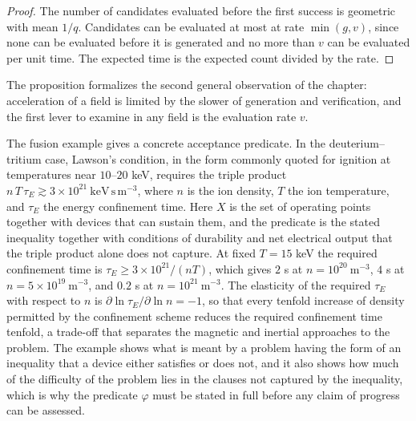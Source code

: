 \begin{proof}
The number of candidates evaluated before the first success is geometric with mean $1/q$. Candidates can be evaluated at most at rate $\min(g,v)$, since none can be evaluated before it is generated and no more than $v$ can be evaluated per unit time. The expected time is the expected count divided by the rate.
\end{proof}

The proposition formalizes the second general observation of the chapter: acceleration of a field is limited by the slower of generation and verification, and the first lever to examine in any field is the evaluation rate $v$.

The fusion example gives a concrete acceptance predicate. In the deuterium--tritium case, Lawson's condition, in the form commonly quoted for ignition at temperatures near $10$--$20$ keV, requires the triple product $n\,T\,\tau_E\gtrsim3\times10^{21}\ \mathrm{keV\,s\,m^{-3}}$, where $n$ is the ion density, $T$ the ion temperature, and $\tau_E$ the energy confinement time. Here $X$ is the set of operating points together with devices that can sustain them, and the predicate is the stated inequality together with conditions of durability and net electrical output that the triple product alone does not capture. At fixed $T=15$ keV the required confinement time is $\tau_E\ge 3\times10^{21}/(nT)$, which gives $2$ s at $n=10^{20}\ \mathrm{m^{-3}}$, $4$ s at $n=5\times10^{19}\ \mathrm{m^{-3}}$, and $0.2$ s at $n=10^{21}\ \mathrm{m^{-3}}$. The elasticity of the required $\tau_E$ with respect to $n$ is $\partial\ln\tau_E/\partial\ln n=-1$, so that every tenfold increase of density permitted by the confinement scheme reduces the required confinement time tenfold, a trade-off that separates the magnetic and inertial approaches to the problem. The example shows what is meant by a problem having the form of an inequality that a device either satisfies or does not, and it also shows how much of the difficulty of the problem lies in the clauses not captured by the inequality, which is why the predicate $\varphi$ must be stated in full before any claim of progress can be assessed.
